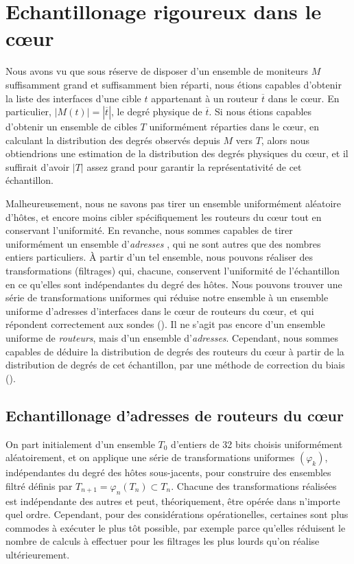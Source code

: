 \section{Echantillonage rigoureux dans le c\oe{}ur}
\label{sec:udpping-many-to-many}

Nous avons vu que sous réserve de disposer d'un ensemble de moniteurs $M$
suffisamment grand et suffisamment bien réparti, nous étions capables d'obtenir
la liste des interfaces d'une cible $t$ appartenant à un routeur $\overline{t}$
dans le c\oe{}ur. En particulier, $|M(t)| = |\overline{t}|$, le degré physique de 
$\overline{t}$. Si nous étions capables d'obtenir un ensemble de
cibles $T$ uniformément réparties dans le c\oe{}ur, en calculant la distribution
des degrés observés depuis $M$ vers $T$, alors nous obtiendrions une estimation
de la distribution des degrés physiques du c\oe{}ur, et il suffirait d'avoir $|T|$ assez
grand pour garantir la représentativité de cet échantillon.

Malheureusement, nous ne savons pas tirer un ensemble uniformément aléatoire
d'hôtes, et encore moins cibler spécifiquement les routeurs du c\oe{}ur tout en
conservant l'uniformité. En revanche, nous sommes capables de tirer uniformément
un ensemble d'{\em adresses \ip}, qui ne sont autres que des nombres entiers
particuliers.
À partir d'un tel ensemble, nous pouvons réaliser des transformations
(filtrages) qui, chacune, conservent l'uniformité de l'échantillon en ce
qu'elles sont indépendantes du degré des hôtes. Nous pouvons trouver une série
de transformations uniformes qui réduise notre ensemble à un ensemble uniforme
d'adresses \ip d'interfaces dans le c\oe{}ur de routeurs du c\oe{}ur, et qui
répondent correctement aux sondes \udpping
(). Il ne s'agit pas encore d'un
ensemble uniforme de {\em routeurs}, mais d'un ensemble d'{\em adresses}.
Cependant, nous sommes capables de déduire la distribution de degrés des
routeurs du c\oe{}ur à partir de la distribution de degrés de cet échantillon,
par une méthode de correction du biais ().

\subsection{Echantillonage d'adresses \ip de routeurs du c\oe{}ur}
\label{subsec:udpping-many-to-many-addresses}

On part initialement d'un ensemble $T_0$ d'entiers de 32 bits choisis
uniformément aléatoirement, et on applique une série de transformations
uniformes $(\varphi_k)$, indépendantes du degré des hôtes sous-jacents, pour
construire des ensembles filtré définis par $T_{n+1} = \varphi_n(T_n) \subset
T_n$.
Chacune des transformations réalisées est indépendante des autres et peut,
théoriquement, être opérée dans n'importe quel ordre. Cependant, pour des
considérations opérationelles, certaines sont plus commodes à exécuter le plus
tôt possible, par exemple parce qu'elles réduisent le nombre de calculs à
effectuer pour les filtrages les plus lourds qu'on réalise ultérieurement.

